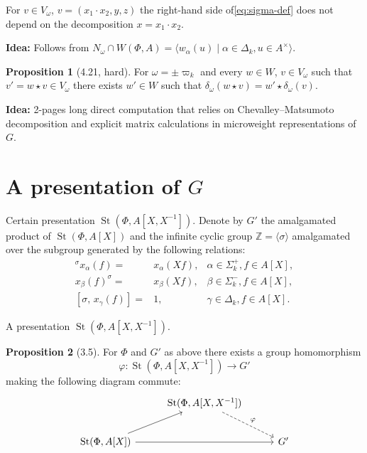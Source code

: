 \documentclass{beamer} %
\DeclareMathOperator{\St}{St}
\theoremstyle{definition}
\newtheorem*{prop}{Proposition}
\begin{document}
\begin{frame}
\begin{lemma}[4.18, easy] For $v \in V_\omega$, $v = (x_1 \cdot x_2, y, z)$ the right-hand side of\eqref{eq:sigma-def} does not depend on the decomposition $x = x_1 \cdot x_2$.
\end{lemma}
\pause \textbf{Idea:} Follows from $N_\omega \cap W(\Phi, A) = \langle w_\alpha(u) \mid \alpha \in \Delta_k, u\in A^\times\rangle$.

\pause \begin{prop}[4.21, hard] \label{prop:v-correctness2}
For $\omega = \pm \varpi_k$ and every $w \in W$, $v \in V_\omega$ such that $v' = w \star v \in V_\omega$ there exists $w' \in W$ such that
$\delta_\omega(w \star v) = w' \star \delta_\omega(v)$.
\end{prop}
\pause \textbf{Idea:} 2-pages long direct computation that relies on Chevalley--Matsumoto decomposition and explicit matrix calculations in microweight representations of $G$.
\end{frame}

\section{A presentation of $G$}

\begin{frame} \tableofcontents[currentsection] \end{frame}

\begin{frame}{Certain presentation $\St(\Phi, A[X, X^{-1}])$.}
Denote by $G'$ the amalgamated product of $\St(\Phi, A[X])$ and the infinite cyclic group $\mathbb{Z}=\langle \sigma \rangle$ amalgamated over the subgroup generated by the following relations:
\begin{align}
{}^\sigma x_{\alpha}(f) = & x_{\alpha} (Xf), & \alpha \in \Sigma^+_k, f \in A[X], \label{eq:sigma-sigma-plus} \\
x_{\beta}(f)^ \sigma     =& x_{\beta} (Xf), & \beta \in \Sigma^-_k, f \in A[X], \label{eq:sigma-sigma-minus} \\
[\sigma,\, x_\gamma(f)]   =& 1, & \gamma \in \Delta_k, f \in A[X]. \label{eq:sigma-delta}
\end{align}

\end{frame}

\begin{frame}{A presentation $\St(\Phi, A[X, X^{-1}])$.}

\begin{prop}[3.5]
For $\Phi$ and $G'$ as above there exists a group homomorphism
\[
\varphi \colon \St(\Phi,A[X,X^{-1}]) \to G'
\]
making the following diagram commute:
\[
\begin{tikzcd}[ampersand replacement=\&, column sep=2.8em, row sep=2.2em]
\& \St(\Phi,A[X,X^{-1}]) \arrow[rd, dashed, "\varphi"] \& \\
\St(\Phi,A[X]) \arrow[ru] \arrow[rr] \&\& G'
\end{tikzcd}
\]
\end{prop}
\end{frame}
\end{document}
